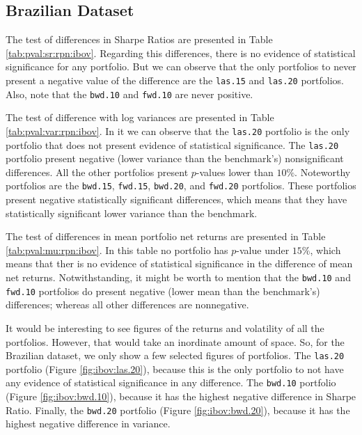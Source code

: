 \documentclass[12pt,oneside,a4paper]{memoir}
\begin{document}
\subsection{Brazilian Dataset}

The test of differences in Sharpe Ratios are presented in Table \ref{tab:pval:sr:rpn:ibov}.
Regarding this differences, there is no evidence of statistical significance for any portfolio.
But we can observe that the only portfolios to never present a negative value of the difference are the \texttt{las.15} and \texttt{las.20} portfolios.
Also, note that the \texttt{bwd.10} and \texttt{fwd.10} are never positive.

The test of difference with log variances are presented in Table \ref{tab:pval:var:rpn:ibov}.
In it we can observe that the \texttt{las.20} portfolio is the only portfolio that does not present evidence of statistical significance.
The \texttt{las.20} portfolio present negative (lower variance than the benchmark's) nonsignificant differences.
All the other portfolios present $p$-values lower than $10\%$.
Noteworthy portfolios are the \texttt{bwd.15}, \texttt{fwd.15}, \texttt{bwd.20}, and \texttt{fwd.20} portfolios.
These portfolios present negative statistically significant differences, which means that they have statistically significant lower variance than the benchmark.

The test of differences in mean portfolio net returns are presented in Table \ref{tab:pval:mu:rpn:ibov}.
In this table no portfolio has $p$-value under $15\%$, which means that ther is no evidence of statistical significance in the difference of mean net returns.
Notwithstanding, it might be worth to mention that the \texttt{bwd.10} and \texttt{fwd.10} portfolios do present negative (lower mean than the benchmark's) differences; whereas all other differences are nonnegative.

It would be interesting to see figures of the returns and volatility of all the portfolios.
However, that would take an inordinate amount of space.
So, for the Brazilian dataset, we only show a few selected figures of portfolios.
The \texttt{las.20} portfolio (Figure \ref{fig:ibov:las.20}), because this is the only portfolio to not have any evidence of statistical significance in any difference.
The \texttt{bwd.10} portfolio (Figure \ref{fig:ibov:bwd.10}), because it has the highest negative difference in Sharpe Ratio.
Finally, the \texttt{bwd.20} portfolio (Figure \ref{fig:ibov:bwd.20}), because it has the highest negative difference in variance.
\end{document}
